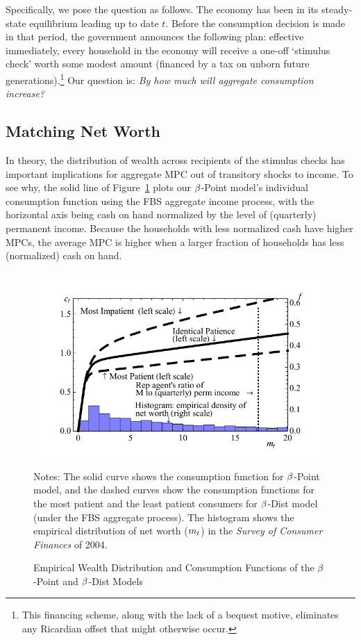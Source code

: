 \documentclass[12pt,titlepage]{econtex}
\begin{document}
Specifically, we pose the question as follows.  The economy has been
in its steady-state equilibrium leading up to date $t$.  Before the
consumption decision is made in that period, the government announces
the following plan: effective immediately, every household in the
economy will receive a one-off `stimulus check' worth some modest
amount (financed by a tax on unborn future
generations).\footnote{This financing scheme, along with the lack of a
  bequest motive, eliminates any Ricardian offset that might otherwise
  occur.} Our question is: \emph{By how much will aggregate consumption increase?}

\subsection{Matching Net Worth}

In theory, the distribution of wealth across recipients of the stimulus checks has important implications for aggregate MPC out
of transitory shocks to income. To see why, the solid line of Figure~\ref{CFuncDistSevenPointPermAndHistNetWorthPlotFedQuarterly} plots our $\beta$-Point model's individual
consumption function using the FBS aggregate income process, with the
horizontal axis being cash on hand normalized by the level of
(quarterly) permanent income. Because the households with less normalized cash have higher MPCs, the average MPC is higher when a larger fraction of households has less (normalized) cash on hand.

\begin{figure}
    \caption{Empirical Wealth Distribution and Consumption Functions of the
      $\beta$-Point and $\beta$-Dist Models}
    \label{CFuncDistSevenPointPermAndHistNetWorthPlotFedQuarterly}
  \begin{center}
    \includegraphics{./Figures/CFuncDistSevenPointPermAndHistNetWorthPlotFedQuarterly}
  \end{center}
    \footnotesize Notes: The solid curve shows the consumption function
    for $\beta$-Point model, and the dashed curves show the consumption functions
    for the most patient and the least patient consumers for
    $\beta$-Dist model (under the FBS aggregate process). The histogram shows the empirical distribution of
    net worth ($m_{t}$) in the \emph{Survey of Consumer Finances} of 2004.
\end{figure}
\end{document}
